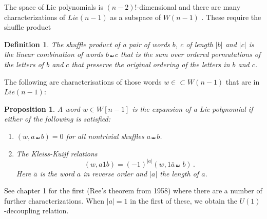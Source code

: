 \documentclass[11pt]{article}
\newcommand{\1}{{\rm 1\hskip-0.25em I}}
\newtheorem{defn}{Definition}[section]
\newtheorem{propn}{Proposition}[section]
\begin{document}
The space of Lie polynomials is $(n-2)!$-dimensional and there are many characterizations of $Lie(n-1)$ as a subspace of $W(n-1)$ \cite{Reutenauer}.  These require the shuffle product

\begin{defn}
The \emph{shuffle product} of a pair of words $b$, $c$ of length $|b|$ and $|c|$  is the  linear combination of words $b\shuffle c$ that is the sum over ordered permutations of the letters of $b$ and $c$ that preserve the original ordering of the letters in $b$ and  $c$. 
\end{defn} 

The following are characterisations of those words   $w\in\subset W(n-1)$ that are in  $Lie(n-1)$:
\begin{propn}\label{Lie-char}
A word $w\in W[n-1]$ is the expansion of a Lie polynomial if either of the following is satisfied:
\begin{enumerate}
\item $(w,a\shuffle b)=0$ for all nontrivial shuffles $a\shuffle b$.
\item The Kleiss-Kuijf relations  \cite{KK1989} 
\begin{equation}
(w, a1b)=(-1)^{|a|}(w,1\bar a\shuffle \ b)\, .
\end{equation}
Here $\bar a$ is the word $a$ in reverse order and $|a|$ the length of $a$.
\end{enumerate}

\end{propn}

See \cite{Reutenauer} chapter 1 for the first (Ree's theorem from 1958) where there are a number of further characterizations.
When $|a|=1$ in the first of these, we obtain the $U(1)$-decoupling relation.
\end{document}
